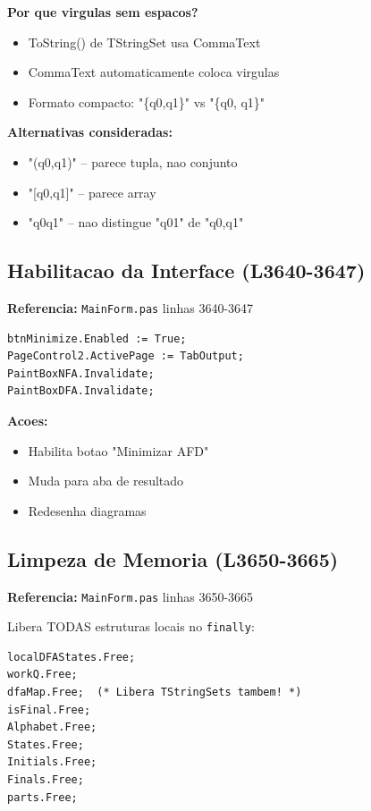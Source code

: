 \documentclass[12pt,a4paper]{article}
\begin{document}
\textbf{Por que virgulas sem espacos?}
\begin{itemize}
    \item ToString() de TStringSet usa CommaText
    \item CommaText automaticamente coloca virgulas
    \item Formato compacto: "\{q0,q1\}" vs "\{q0, q1\}"
\end{itemize}

\textbf{Alternativas consideradas:}
\begin{itemize}
    \item "(q0,q1)" -- parece tupla, nao conjunto
    \item "[q0,q1]" -- parece array
    \item "q0q1" -- nao distingue "q01" de "q0,q1"
\end{itemize}

\subsection{Habilitacao da Interface (L3640-3647)}

\textbf{Referencia:} \texttt{MainForm.pas} linhas 3640-3647

\begin{lstlisting}[style=pascal]
btnMinimize.Enabled := True;
PageControl2.ActivePage := TabOutput;
PaintBoxNFA.Invalidate;
PaintBoxDFA.Invalidate;
\end{lstlisting}

\textbf{Acoes:}
\begin{itemize}
    \item Habilita botao "Minimizar AFD"
    \item Muda para aba de resultado
    \item Redesenha diagramas
\end{itemize}

\subsection{Limpeza de Memoria (L3650-3665)}

\textbf{Referencia:} \texttt{MainForm.pas} linhas 3650-3665

Libera TODAS estruturas locais no \texttt{finally}:

\begin{lstlisting}[style=pascal]
localDFAStates.Free;
workQ.Free;
dfaMap.Free;  (* Libera TStringSets tambem! *)
isFinal.Free;
Alphabet.Free;
States.Free;
Initials.Free;
Finals.Free;
parts.Free;
\end{lstlisting}
\end{document}
